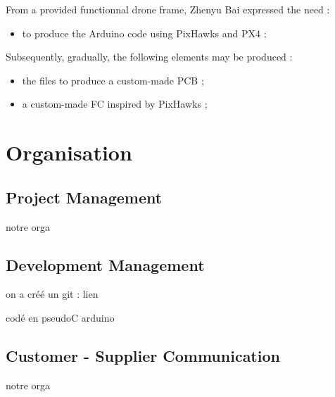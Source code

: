 \documentclass{beamer}
\begin{document}
\begin{frame}
    
    From a provided functionnal drone frame, Zhenyu Bai expressed the need :\pause
    \begin{itemize}
        \item to produce the Arduino code using PixHawks and PX4 ;
    \end{itemize}

    \pause
    
    \vspace*{5mm}

    Subsequently, gradually, the following elements may be produced :
    \pause

    \begin{itemize}
        \item the files to produce a custom-made PCB ; \pause
        \item a custom-made FC inspired by PixHawks ;
    \end{itemize}
\end{frame}



\section{Organisation}
\subsection{Project Management}
\begin{frame}
    notre orga
\end{frame}



\subsection{Development Management}
\begin{frame}
    on a créé un git : lien

    codé en pseudoC arduino
\end{frame}



\subsection{Customer - Supplier Communication}
\begin{frame}
    notre orga
\end{frame}
\end{document}
